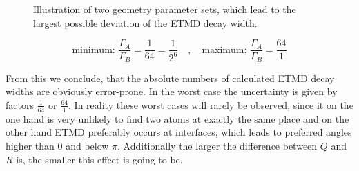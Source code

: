 \begin{figure}[h]
 \centering
 
 \caption{Illustration of two geometry parameter sets, which lead
          to the largest possible deviation of the ETMD decay width.}
 \label{}
\end{figure}

\begin{equation}
\text{minimum: } \frac{\Gamma_{A}}{\Gamma_B}= \frac{1}{64} = \frac{1}{2^6} \quad ,\quad
\text{maximum: } \frac{\Gamma_{A}}{\Gamma_B}= \frac{64}{1}
\end{equation}

From this we conclude, that the absolute numbers of calculated ETMD
decay widths are obviously error-prone. In the worst case the uncertainty
is given by factors $\frac{1}{64}$ or $\frac{64}{1}$.
In reality these worst cases will rarely be observed, since it on
the one hand is very unlikely to find two atoms at exactly the same place
and on the other hand ETMD preferably occurs at interfaces, which leads
to preferred angles higher than 0 and below $\pi$.
Additionally the larger the difference between $Q$ and $R$ is, the
smaller this effect is going to be.


